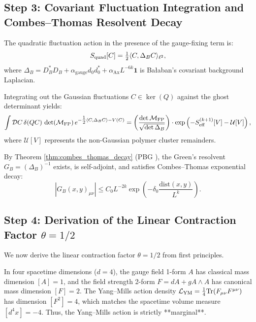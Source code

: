\subsection{Step 3: Covariant Fluctuation Integration and Combes--Thomas Resolvent Decay}
\label{subsec:step3_resolvent_inversion}

The quadratic fluctuation action in the presence of the gauge-fixing term is:
\begin{equation}
S_{\mathrm{quad}}[C] = \tfrac{1}{2} \langle C, \Delta_B C \rangle_{\ell^2},
\end{equation}
where $\Delta_B = D_B^* D_B + \alpha_{\mathrm{gauge}} d_0 d_0^* + \alpha_{\mathrm{Ax}} L^{-6k} \mathbf{1}$ is Ba\l aban's covariant background Laplacian.

Integrating out the Gaussian fluctuations $C \in \ker(Q)$ against the ghost determinant yields:
\begin{equation}
\label{eq:ch14_gaussian_effective_action}
\int \mathcal{D}C \, \delta(QC) \, \det(\mathcal{M}_{\mathrm{FP}}) \, e^{-\tfrac{1}{2} \langle C, \Delta_B C \rangle - V(C)} = \left( \frac{\det \mathcal{M}_{\mathrm{FP}}}{\sqrt{\det \Delta_B}} \right) \cdot \exp\left( -S_{\mathrm{eff}}^{(k+1)}[V] - \mathcal{U}[V] \right),
\end{equation}
where $\mathcal{U}[V]$ represents the non-Gaussian polymer cluster remainders.

By Theorem \ref{thm:combes_thomas_decay} (PBG \cite{Balaban1985b}), the Green's resolvent $G_B = (\Delta_B)^{-1}$ exists, is self-adjoint, and satisfies Combes--Thomas exponential decay:
\begin{equation}
\label{eq:ch14_gb_combes_thomas_decay}
\left| G_B(x, y)_{\mu\nu} \right| \le C_0 L^{-2k} \exp\left( -\delta_0 \frac{\mathrm{dist}(x, y)}{L^k} \right).
\end{equation}

\subsection{Step 4: Derivation of the Linear Contraction Factor \texorpdfstring{$\theta = 1/2$}{theta = 1/2}}
\label{subsec:step4_theta_derivation}

We now derive the linear contraction factor $\theta = 1/2$ from first principles.

In four spacetime dimensions ($d = 4$), the gauge field 1-form $A$ has classical mass dimension $[A] = 1$, and the field strength 2-form $F = dA + g A \wedge A$ has canonical mass dimension $[F] = 2$.
The Yang--Mills action density $\mathcal{L}_{\mathrm{YM}} = \frac{1}{4} \mathrm{Tr}(F_{\mu\nu} F^{\mu\nu})$ has dimension $[F^2] = 4$, which matches the spacetime volume measure $[d^4x] = -4$. Thus, the Yang--Mills action is strictly **marginal**.

